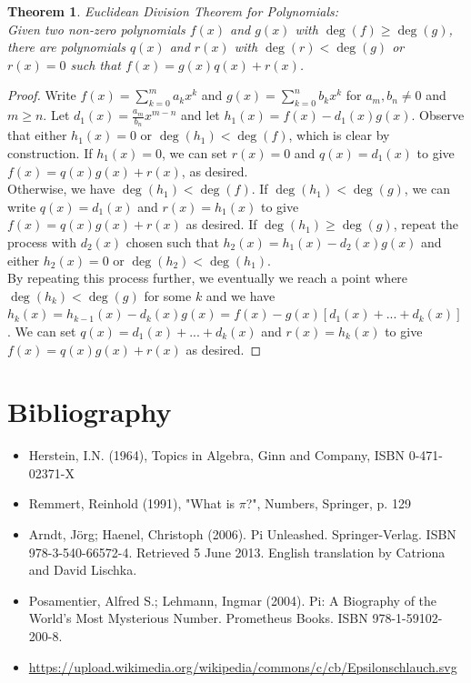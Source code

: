 \documentclass[12pt, a4paper, titlepage, twoside]{article}
\newtheorem*{theorem*}{Theorem}
\begin{document}
	\newpage	
	
	\begin{pf}
		\label{apA:euc-div}
		\begin{theorem*}
			Euclidean Division Theorem for Polynomials:\\
			Given two non-zero polynomials $f(x)$ and $g(x)$ with $\deg(f) \geqslant \deg(g)$, there are polynomials
			$q(x)$ and $r(x)$ with $\deg(r) < \deg(g)$ or $r(x) = 0$ such that $f(x) = g(x)q(x) + r(x)$.
		\end{theorem*}

		\tcbline		
		
		\begin{proof}
			Write $f(x) = \sum_{k=0}^m a_k x^k$ and $g(x) = \sum_{k=0}^n b_k x^k$ for $a_m, b_n \neq 0$ and $m \geqslant n$.
			Let $d_1(x) = \frac{a_m}{b_n}x^{m-n}$ and let $h_1(x) = f(x) - d_1(x) g(x)$.
			Observe that either $h_1(x) = 0$ or $\deg(h_1) < \deg(f)$, which is clear by construction.
			If $h_1(x) = 0$, we can set $r(x) = 0$ and $q(x) = d_1(x)$ to give $f(x) = q(x) g(x) + r(x)$, as desired.\\
			
			Otherwise, we have $\deg(h_1) < \deg(f)$. If $\deg(h_1) < \deg(g)$, we
			can write $q(x) = d_1(x)$ and $r(x) = h_1(x)$ to give $f(x) = q(x) g(x) + r(x)$ as desired. If $\deg(h_1) \geqslant \deg(g)$, repeat the 
			process with $d_2(x)$ chosen such that $h_2(x) = h_1(x) - d_2(x) g(x)$ and either $h_2(x) = 0$ or $\deg(h_2) < \deg(h_1)$.\\
			
			By repeating this process further, we
			eventually we reach a point where $\deg(h_k) < \deg(g)$ for some $k$ and we have $h_k(x) = h_{k-1}(x) - d_k(x) g(x)
			= f(x) - g(x) [d_1(x) + ... + d_k(x)]$.
			We can set $q(x) = d_1(x) + ... + d_k(x)$ and $r(x) = h_k(x)$ to give $f(x) = q(x) g(x) + r(x)$ as desired.
		\end{proof}
	\end{pf}
	
	\newpage	
	
\section{Bibliography}
	\begin{itemize}
		\item Herstein, I.N. (1964), Topics in Algebra, Ginn and Company, ISBN 0-471-02371-X
		\item Remmert, Reinhold (1991), "What is $\pi$?", Numbers, Springer, p. 129
		\item Arndt, Jörg; Haenel, Christoph (2006). Pi Unleashed. Springer-Verlag. ISBN 978-3-540-66572-4. Retrieved 5 June 2013. 
		English translation by Catriona and David Lischka.
		\item Posamentier, Alfred S.; Lehmann, Ingmar (2004). Pi: A Biography of the World's Most Mysterious Number. Prometheus Books. 
		ISBN 978-1-59102-200-8.
		\item \sloppy \url{https://upload.wikimedia.org/wikipedia/commons/c/cb/Epsilonschlauch.svg}
	\end{itemize}		
\end{document}
